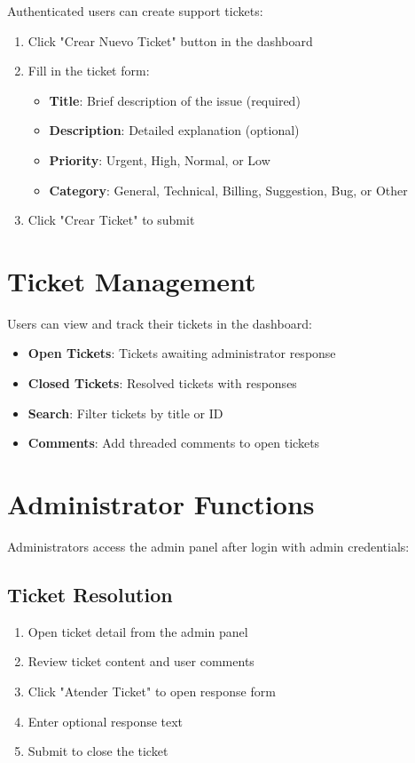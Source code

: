 \documentclass[12pt,a4paper]{report}
\begin{document}
Authenticated users can create support tickets:

\begin{enumerate}
    \item Click "Crear Nuevo Ticket" button in the dashboard
    \item Fill in the ticket form:
    \begin{itemize}
        \item \textbf{Title}: Brief description of the issue (required)
        \item \textbf{Description}: Detailed explanation (optional)
        \item \textbf{Priority}: Urgent, High, Normal, or Low
        \item \textbf{Category}: General, Technical, Billing, Suggestion, Bug, or Other
    \end{itemize}
    \item Click "Crear Ticket" to submit
\end{enumerate}

\section{Ticket Management}
\label{sec:ticket-mgmt}

Users can view and track their tickets in the dashboard:

\begin{itemize}
    \item \textbf{Open Tickets}: Tickets awaiting administrator response
    \item \textbf{Closed Tickets}: Resolved tickets with responses
    \item \textbf{Search}: Filter tickets by title or ID
    \item \textbf{Comments}: Add threaded comments to open tickets
\end{itemize}

\section{Administrator Functions}
\label{sec:admin-functions}

Administrators access the admin panel after login with admin credentials:

\subsection{Ticket Resolution}
\begin{enumerate}
    \item Open ticket detail from the admin panel
    \item Review ticket content and user comments
    \item Click "Atender Ticket" to open response form
    \item Enter optional response text
    \item Submit to close the ticket
\end{enumerate}
\end{document}
